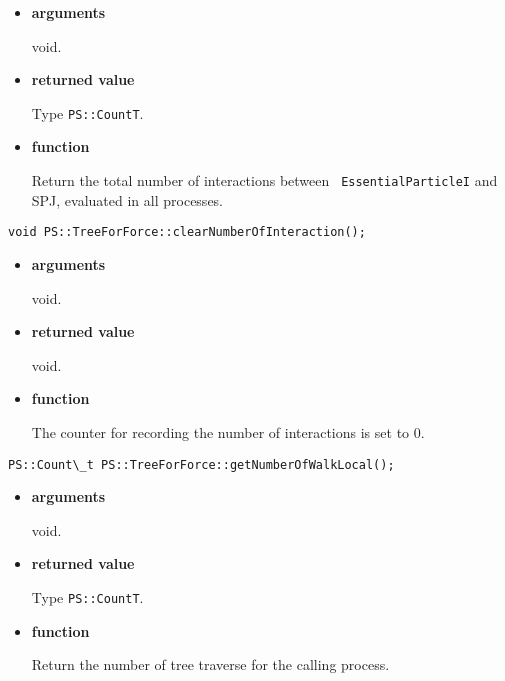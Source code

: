 \begin{itemize}

\item {\bf arguments}

void.

\item {\bf returned value}

Type {\tt PS::CountT}.

\item {\bf function}

Return the total number of interactions between {\tt
EssentialParticleI} and SPJ, evaluated in all processes.


\end{itemize}

\begin{screen}
\begin{verbatim}
void PS::TreeForForce::clearNumberOfInteraction();
\end{verbatim}
\end{screen}

\begin{itemize}

\item {\bf arguments}

void.

\item {\bf returned value}

void.

\item {\bf function}

The counter for recording the number of interactions is set to 0.

\end{itemize}

\begin{screen}
\begin{verbatim}
PS::Count\_t PS::TreeForForce::getNumberOfWalkLocal();
\end{verbatim}
\end{screen}

\begin{itemize}

\item {\bf arguments}

void.

\item {\bf returned value}

Type {\tt PS::CountT}.

\item {\bf function}

Return the number of tree traverse for the calling process.

\end{itemize}

